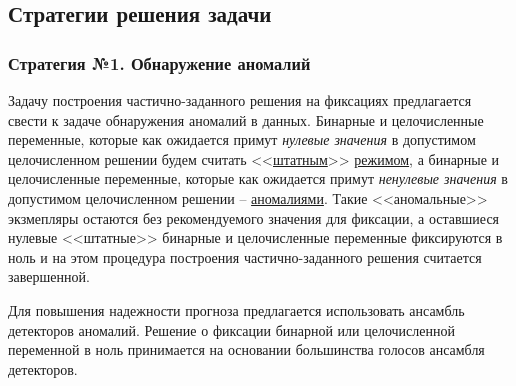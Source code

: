 \documentclass[%
	11pt,
	a4paper,
	utf8,
		]{article}
\begin{document}
\subsection{Стратегии решения задачи}

\subsubsection{Стратегия №1. Обнаружение аномалий}\label{sec:obj_detect}

%
%

Задачу построения частично-заданного решения на фиксациях предлагается свести к задаче обнаружения аномалий в данных. Бинарные и целочисленные переменные, которые {как ожидается} примут \emph{нулевые значения} в допустимом целочисленном решении будем считать <<\underline{штатным}>> \underline{режимом}, а бинарные и целочисленные переменные, которые {как ожидается} примут \emph{ненулевые значения} в допустимом целочисленном решении -- \underline{аномалиями}. Такие <<аномальные>> экзмепляры остаются без рекомендуемого значения для фиксации, а оставшиеся нулевые <<штатные>> бинарные и целочисленные переменные фиксируются в ноль и на этом процедура построения частично-заданного решения считается завершенной.

Для повышения надежности прогноза предлагается использовать ансамбль детекторов аномалий. Решение о фиксации бинарной или целочисленной переменной в ноль принимается на основании большинства голосов ансамбля детекторов.
\end{document}
